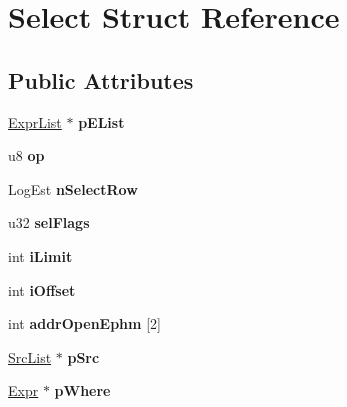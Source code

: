 \hypertarget{struct_select}{}\section{Select Struct Reference}
\label{struct_select}
\subsection*{Public Attributes}
\begin{DoxyCompactItemize}
\item 
\mbox{\label{struct_select_acf92c5d6b0e0e6a3263a77696baaadc8}} 
\mbox{\hyperlink{struct_expr_list}{Expr\+List}} $\ast$ {\bfseries p\+E\+List}
\item 
\mbox{\label{struct_select_a84506d61248313b5e10f7891cb7482be}} 
u8 {\bfseries op}
\item 
\mbox{\label{struct_select_af9e46e47a41ceb9815690851f7e88219}} 
Log\+Est {\bfseries n\+Select\+Row}
\item 
\mbox{\label{struct_select_a8114a0684cb5f38d5f6ef3855114c928}} 
u32 {\bfseries sel\+Flags}
\item 
\mbox{\label{struct_select_abf68908bf029af42a32c60a2558a8b1e}} 
int {\bfseries i\+Limit}
\item 
\mbox{\label{struct_select_ac12bebd00ed988df3ad1efb8e6c63fe4}} 
int {\bfseries i\+Offset}
\item 
\mbox{\label{struct_select_a7b55849c381b5452e42313aa7aa183ec}} 
int {\bfseries addr\+Open\+Ephm} \mbox{[}2\mbox{]}
\item 
\mbox{\label{struct_select_a4e3b9b176a8e1b4af988405ff1f090db}} 
\mbox{\hyperlink{struct_src_list}{Src\+List}} $\ast$ {\bfseries p\+Src}
\item 
\mbox{\label{struct_select_a0562c1e19acde263a04af015611d8ce8}} 
\mbox{\hyperlink{struct_expr}{Expr}} $\ast$ {\bfseries p\+Where}
\item 
\mbox{\label{struct_select_a5b625c7495468ae56ca2f214a76231a0}} 

\end{DoxyCompactItemize}
